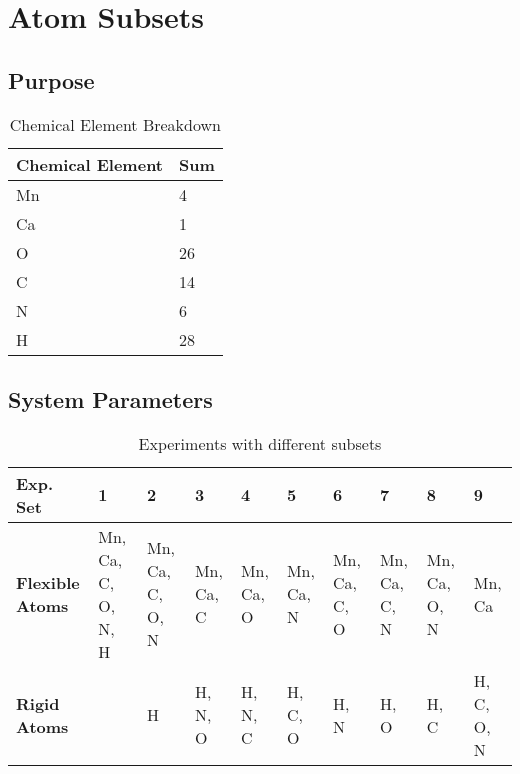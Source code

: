 \section{Atom Subsets}

\subsection{Purpose}


\begin{table}
	\centering
	\begin{tabular}{ | l | l | }
		\hline
		\textbf{Chemical Element} & \textbf{Sum} \\ \hline
		Mn & 4 \\ \hline
		Ca & 1 \\ \hline
		O & 26 \\ \hline
		C & 14 \\ \hline
		N & 6 \\ \hline
		H & 28 \\ \hline
	\end{tabular}
	\caption{Chemical Element Breakdown}
	\label{table:atom-breakdown}
\end{table}

\subsection{System Parameters}

\begin{table}
	\centering
	\begin{tabular}{ | >{\bfseries}p{2cm} | p{1cm} | p{1cm} | p{1cm} | p{1cm} | p{1cm} | p{1cm} | p{1cm} | p{1cm} | p{1cm} | }
		\hline
		Exp. Set & 1 & 2 & 3 & 4 & 5 & 6 & 7 & 8 & 9 \\ \hline
		Flexible Atoms & Mn, Ca, C, O, N, H & Mn, Ca, C, O, N & Mn, Ca, C & Mn, Ca, O & Mn, Ca, N & Mn, Ca, C, O & Mn, Ca, C, N & Mn, Ca, O, N & Mn, Ca \\ \hline
		Rigid Atoms &  & H & H, N, O & H, N, C & H, C, O & H, N & H, O & H, C & H, C, O, N \\ \hline
	\end{tabular}
	\caption{Experiments with different subsets}
	\label{table:subset-setup}
\end{table}

